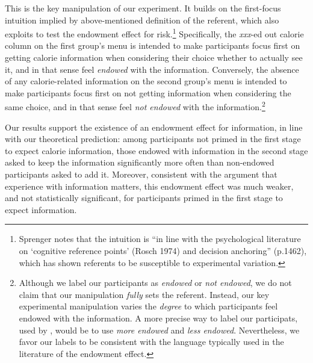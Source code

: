 \documentclass[12pt]{article}
\begin{document}
This is the key manipulation of our experiment. It builds on the first-focus intuition implied by \citet{koszegiModelReferenceDependentPreferences2006} above-mentioned definition of the referent, which \citet{sprengerEndowmentEffectRisk2015} also exploits to test the endowment effect for risk.\footnote{Sprenger notes that the intuition is \enquote{in line with the psychological literature on \enquote{cognitive reference points} (Rosch 1974) and decision anchoring} (p.1462), which has shown referents to be susceptible to experimental variation.} Specifically, the \emph{xxx}-ed out calorie column on the first group's menu is intended to make participants focus first on getting calorie information when considering their choice whether to actually see it, and in that sense feel \emph{endowed} with the information. Conversely, the absence of any calorie-related information on the second group's menu is intended to make participants focus first on not getting information when considering the same choice, and in that sense feel \emph{not endowed} with the information.\footnote{Although we label our participants as \emph{endowed} or \emph{not endowed}, we do not claim that our manipulation \emph{fully} sets the referent. Instead, our key experimental manipulation varies the \emph{degree} to which participants feel endowed with the information. A more precise way to label our participats, used by \citet{heffetzEndowmentEffectExpectations2014}, would be to use \emph{more endowed} and \emph{less endowed}. Nevertheless, we favor our labels to be consistent with the language typically used in the literature of the endowment effect.}

Our results support the existence of an endowment effect for information, in line with our theoretical prediction: among participants not primed in the first stage to expect calorie information, those endowed with information in the second stage asked to keep the information significantly more often than non-endowed participants asked to add it. Moreover, consistent with the argument that experience with information matters, this endowment effect was much weaker, and not statistically significant, for participants primed in the first stage to expect information.
\end{document}
